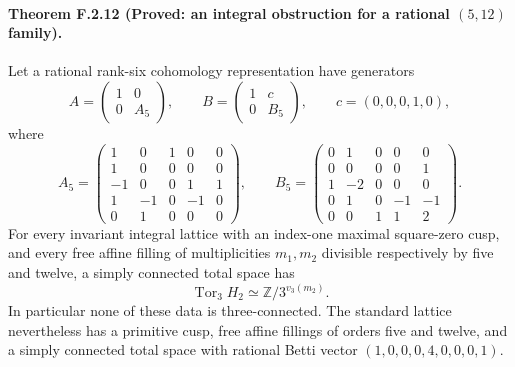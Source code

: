 \paragraph{Theorem F.2.12 (Proved: an integral obstruction for a rational $(5,12)$ family).}
Let a rational rank-six cohomology representation have generators
\[
 A=\begin{pmatrix}1&0\\0&A_5\end{pmatrix},\qquad
 B=\begin{pmatrix}1&c\\0&B_5\end{pmatrix},\qquad
 c=(0,0,0,1,0),
\]
where
\[
 A_5=\begin{pmatrix}
 1&0&1&0&0\\1&0&0&0&0\\-1&0&0&1&1\\
 1&-1&0&-1&0\\0&1&0&0&0
 \end{pmatrix},\qquad
 B_5=\begin{pmatrix}
 0&1&0&0&0\\0&0&0&0&1\\1&-2&0&0&0\\
 0&1&0&-1&-1\\0&0&1&1&2
 \end{pmatrix}.
 \tag{F.33}
\]
For every invariant integral lattice with an index-one maximal
square-zero cusp, and every free affine filling of multiplicities
$m_1,m_2$ divisible respectively by five and twelve, a simply
connected total space has
\[
 \operatorname{Tor}_3 H_2
       \simeq\mathbb Z/3^{v_3(m_2)}.
 \tag{F.34}
\]
In particular none of these data is three-connected.
The standard lattice nevertheless has a primitive cusp,
free affine fillings of orders five and twelve, and a simply
connected total space with rational Betti vector
$(1,0,0,0,4,0,0,0,1)$.

